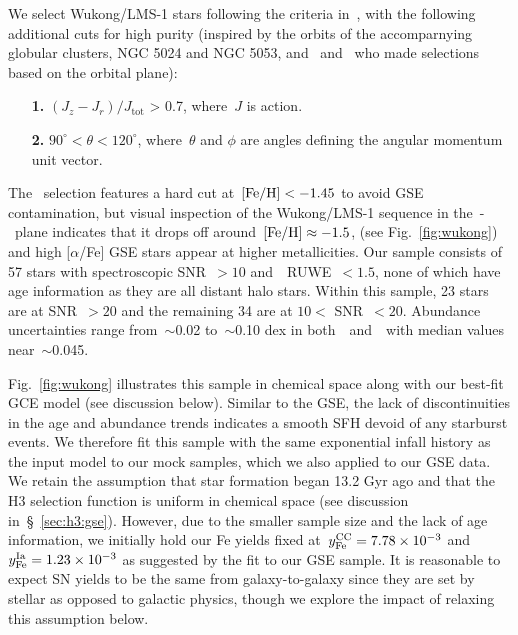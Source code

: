We select Wukong/LMS-1 stars following the criteria in~\citet{Naidu2020}, with
the following additional cuts for high purity (inspired by the orbits of the
accomparnying globular clusters, NGC 5024 and NGC 5053, and~\citealt{Yuan2020}
and~\citealt{Malhan2021} who made selections based on the orbital plane):
\begin{itemize}

	\item[\textbf{1.}] $(J_z - J_r) / J_\text{tot}$ > 0.7, where~$J$ is action.

	\item[\textbf{2.}] $90^\circ < \theta < 120^\circ$, where~$\theta$ and
	$\phi$ are angles defining the angular momentum unit vector.

\end{itemize}
The~\citet{Naidu2020} selection features a hard cut at~$\text{[Fe/H]} < -1.45$ to avoid
GSE contamination, but visual inspection of the Wukong/LMS-1 sequence in
the~\afe-\feh~plane indicates that it drops off around~$\text{[Fe/H]} \approx -1.5$,
(see Fig.~\ref{fig:wukong}) and high [$\alpha$/Fe] GSE stars appear at higher
metallicities.
Our sample consists of 57 stars with spectroscopic SNR~$> 10$
and~\gaia~RUWE~$< 1.5$, none of which have age information as they are all
distant halo stars.
Within this sample, 23 stars are at SNR~$> 20$ and the remaining 34 are at
$10 <$ SNR~$< 20$.
Abundance uncertainties range from~$\sim$0.02 to~$\sim$0.10 dex in
both~\afe~and~\feh~with median values near~$\sim$0.045.
\par
Fig.~\ref{fig:wukong} illustrates this sample in chemical space along with our
best-fit GCE model (see discussion below).
Similar to the GSE, the lack of discontinuities in the age and abundance trends
indicates a smooth SFH devoid of any starburst events.
We therefore fit this sample with the same exponential infall history as the
input model to our mock samples, which we also applied to our GSE data.
We retain the assumption that star formation began 13.2 Gyr ago and that the H3
selection function is uniform in chemical space (see discussion
in~\S~\ref{sec:h3:gse}).
However, due to the smaller sample size and the lack of age information, we
initially hold our Fe yields fixed at~$y_\text{Fe}^\text{CC} = 7.78\times10^{-3}$ and
$y_\text{Fe}^\text{Ia} = 1.23\times10^{-3}$ as suggested by the fit to our GSE sample.
It is reasonable to expect SN yields to be the same from galaxy-to-galaxy since
they are set by stellar as opposed to galactic physics, though we explore the
impact of relaxing this assumption below.
\par
